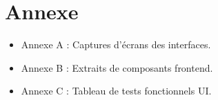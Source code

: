 \chapter*{Annexe}

\begin{itemize}
  \item Annexe A : Captures d'écrans des interfaces.
  \item Annexe B : Extraits de composants frontend.
  \item Annexe C : Tableau de tests fonctionnels UI.
\end{itemize}
